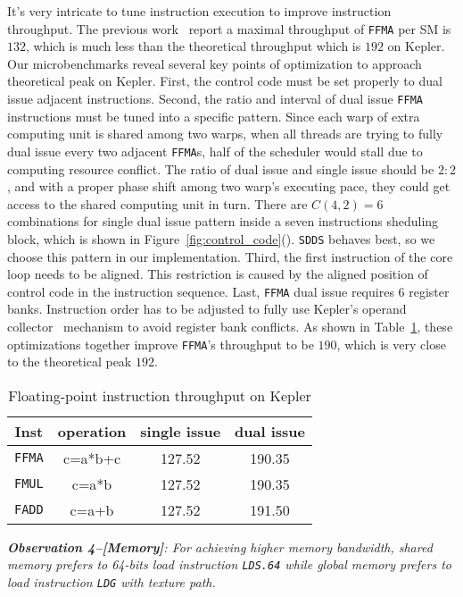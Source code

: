 It's very intricate to tune instruction execution to improve instruction throughput. The previous work~\cite{lai} report a maximal throughput of {\tt FFMA} per SM is $132$, which is much less than the theoretical throughput which is $192$ on Kepler. Our microbenchmarks reveal several key points of optimization to approach theoretical peak on Kepler. First, the control code must be set properly to dual issue adjacent instructions. Second, the ratio and interval of dual issue {\tt FFMA} instructions must be tuned into a specific pattern. Since each warp of extra computing unit is shared among two warps, when all threads are trying to fully dual issue every two adjacent {\tt FFMA}s, half of the scheduler would stall due to computing resource conflict. The ratio of dual issue and single issue should be $2:2$, and with a proper phase shift among two warp's executing pace, they could get access to the shared computing unit in turn. There are $C(4,2)=6$ combinations for single dual issue pattern inside a seven instructions sheduling block, which is shown in Figure~\ref{fig:control_code}(). {\tt SDDS} behaves best, so we choose this pattern in our implementation. Third, the first instruction of the core loop needs to be aligned. This restriction is caused by the aligned position of control code in the instruction sequence. Last, {\tt FFMA} dual issue requires 6 register banks. Instruction order has to be adjusted to fully use Kepler's operand collector~\cite{collector,tarjan2012policy} mechanism to avoid register bank conflicts. As shown in Table~\ref{tab:ffma}, these optimizations together improve {\tt FFMA}'s throughput  to be $190$, which is very close to the theoretical peak $192$.

\begin{table}[htbp]
\caption{Floating-point instruction throughput on Kepler}
\centering
\scalebox{1.} {
\begin{tabular}{|c||c|c|c|}
\hline
Inst &operation&single issue&dual issue\\
\hline
{\tt FFMA} &c=a*b+c&127.52&190.35 \\
\hline
{\tt FMUL} &c=a*b&127.52&190.35 \\
\hline
{\tt FADD} &c=a+b&127.52&191.50\\
\hline
\end{tabular}
}
\label{tab:ffma}
\end{table}


{\em {\bf Observation 4--[Memory]}: For achieving higher memory bandwidth, shared memory prefers to 64-bits load instruction {\tt LDS.64} while global memory prefers to load instruction {\tt LDG} with texture path.}

